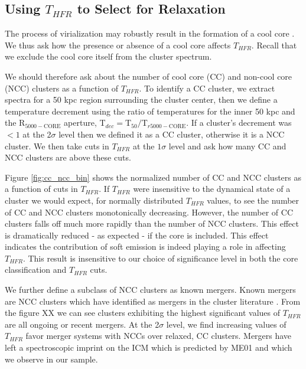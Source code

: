 \documentclass{emulateapj}
\newcommand{\tf}{T_{HFR} }
\begin{document}
{%
\subsection{Using $\tf$ to Select for Relaxation} \label{sec:cc_ncc}





The process of virialization may robustly
result in the formation of a cool core \citep{2006ApJ...640..673O}.
We thus ask how the presence or absence of a cool core 
affects $\tf$. Recall that we exclude the cool core itself from the
cluster spectrum.


We should therefore ask about the number of cool core (CC) and non-cool core
(NCC) clusters as a function of $\tf$. 
To identify a CC cluster, 
we extract
spectra for a 50 kpc region surrounding the cluster center, then we define
a temperature decrement using the ratio of temperatures for the inner
50 kpc and the R$_{5000-\text{CORE}}$ aperture, T$_{dec} =
$T$_{50}/$T$_{r5000-\text{CORE}}$. If a cluster's decrement was $< 1$ at the
2$\sigma$ level then we defined it as a CC cluster, otherwise it is a
NCC cluster. We then take cuts in $\tf$ at the $1\sigma$
level and ask how many CC and NCC clusters are above these cuts.

Figure \ref{fig:cc_ncc_bin} shows the normalized number of CC
and NCC clusters as a function of cuts in $\tf$. If $\tf$ were
insensitive to the dynamical state of a cluster we would expect, for
normally distributed $\tf$ values, to see the number of CC
and NCC clusters monotonically decreasing. However, the number of CC
clusters falls off much more rapidly than the number of NCC
clusters. This effect is dramatically reduced - as expected - if the core is included.
This effect  indicates the contribution of soft emission  is indeed playing a role
in affecting $\tf$. This result is insensitive to our
choice of significance level in both the core classification and
$\tf$ cuts.


We further define a subclass of NCC clusters as known mergers. Known 
mergers are NCC clusters
which have identified as mergers in the cluster literature .
From the figure XX we can see clusters exhibiting the highest significant
values of $\tf$ are all ongoing or recent mergers. At the 2$\sigma$ level, we
find increasing values of $\tf$ favor merger systems with NCCs
over relaxed, CC clusters. Mergers have left a spectroscopic imprint
on the ICM which is predicted by ME01 and which we observe in our sample.

}
\end{document}
